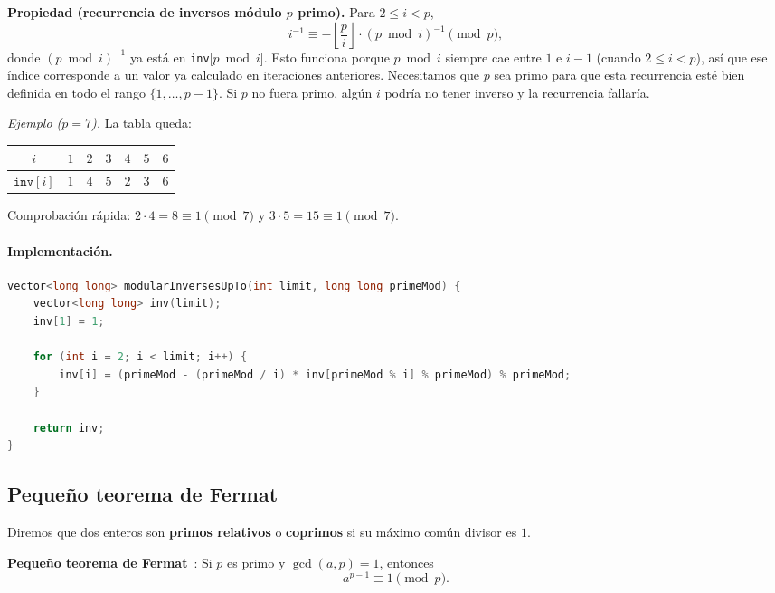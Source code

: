 \textbf{Propiedad (recurrencia de inversos módulo $p$ primo).} Para $2 \le i < p$,
\[
i^{-1} \equiv -\left\lfloor \frac{p}{i} \right\rfloor \cdot (p \bmod i)^{-1} \pmod{p},
\]
donde $(p \bmod i)^{-1}$ ya está en \texttt{inv}[$p \bmod i$]. Esto funciona porque $p \bmod i$ siempre cae entre $1$ e $i-1$ (cuando $2 \le i < p$), así que ese índice corresponde a un valor ya calculado en iteraciones anteriores. Necesitamos que $p$ sea primo para que esta recurrencia esté bien definida en todo el rango $\{1,\dots, p-1\}$. Si $p$ no fuera primo, algún $i$ podría no tener inverso y la recurrencia fallaría. 

\textit{Ejemplo ($p=7$).} La tabla queda:

\begin{center}
\small
\begin{tabular}{|c|c|c|c|c|c|c|}
\hline
$i$ & $1$ & $2$ & $3$ & $4$ & $5$ & $6$ \\
\hline
$\texttt{inv}[i]$ & $1$ & $4$ & $5$ & $2$ & $3$ & $6$ \\
\hline
\end{tabular}
\end{center}

Comprobación rápida: $2 \cdot 4 = 8 \equiv 1 \pmod{7}$ y $3 \cdot 5 = 15 \equiv 1 \pmod{7}$.

\paragraph{Implementación.}

\begin{lstlisting}[language=C++]
vector<long long> modularInversesUpTo(int limit, long long primeMod) {
    vector<long long> inv(limit);
    inv[1] = 1;

    for (int i = 2; i < limit; i++) {
        inv[i] = (primeMod - (primeMod / i) * inv[primeMod % i] % primeMod) % primeMod;
    }

    return inv;
}
\end{lstlisting}
\subsection*{Pequeño teorema de Fermat}

Diremos que dos enteros son \textbf{primos relativos} o \textbf{coprimos} si su máximo común divisor es $1$.

\textbf{Pequeño teorema de Fermat}~\cite{perez_numeros}: Si $p$ es primo y $\gcd(a, p) = 1$, entonces
\[
a^{p-1} \equiv 1 \pmod{p}.
\]

